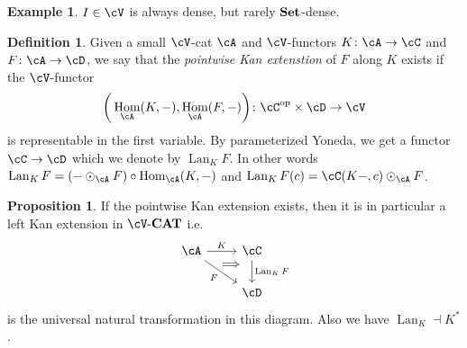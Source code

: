 \documentclass[a4paper,11pt,oneside,openany]{scrbook}
\newcommand{\catname}[1]{{\normalfont\textbf{#1}}}
\newcommand{\Set}{\catname{Set}}
\newcommand{\CAT}{\catname{CAT}}
\newcommand{\from}{\colon}
\DeclareMathOperator{\Hom}{\text{Hom}}
\DeclareMathOperator{\op}{\text{op}}
\DeclareMathOperator{\Lan}{Lan}
\theoremstyle{definition}
\theoremstyle{definition}
\newtheorem{defn}[thm]{Definition} %
\newtheorem{prop}[thm]{Proposition}
\newtheorem{exmp}[thm]{Example}
\begin{document}
\begin{exmp}
    $ I \in \cV $ is always dense, but rarely $ \Set $-dense.
\end{exmp}
\begin{defn}
    Given a small $ \cV $-cat $ \cA $ and $ \cV $-functors $ K\from \cA \to \cC $ and $ F \from \cA \to \cD$, we say that the \emph{pointwise Kan extenstion} of $ F $ along $ K $ exists if the $ \cV $-functor
    \begin{displaymath}
	[\cA^{\op}, \cV]\bigg(\Hom_{\cA} (K,-) ,\Hom_{\cA}(F,-)\bigg) \from \cC^{\op} \times  \cD \to \cV
    \end{displaymath}
    is representable in the first variable.
    By parameterized Yoneda, we get a functor $ \cC \to \cD $ which we denote by $ \Lan_K F $. In other words $ \Lan_K F = (- \odot_\cA F) \circ \Hom_\cA(K,-) $ and $ \Lan_K F(c) = \cC(K-,c)\odot _\cA F $.
\end{defn}
\begin{prop}
    If the pointwise Kan extension exists, then it is in particular a left Kan extension in $ \cV \text{-} \CAT $ i.e.
    \begin{displaymath}
        \begin{tikzcd}
	    \cA \arrow[r, "K"]\arrow[rd,"F"', 	""{name=F,marking,near start}] 	 &
	    \cC \arrow[d, "{\Lan_K F}",		""{name=L,marking,above, near start}]	\\
	    & \cD
	    \arrow[Rightarrow, from=F, to=L, shorten <=10pt, shorten >=10pt, start anchor={north west}, end anchor={[yshift=1pt]}]
        \end{tikzcd}
    \end{displaymath}
    is the universal natural transformation in this diagram.
    Also we have $ \Lan_K \dashv K^* $.
\end{prop}
\end{document}
